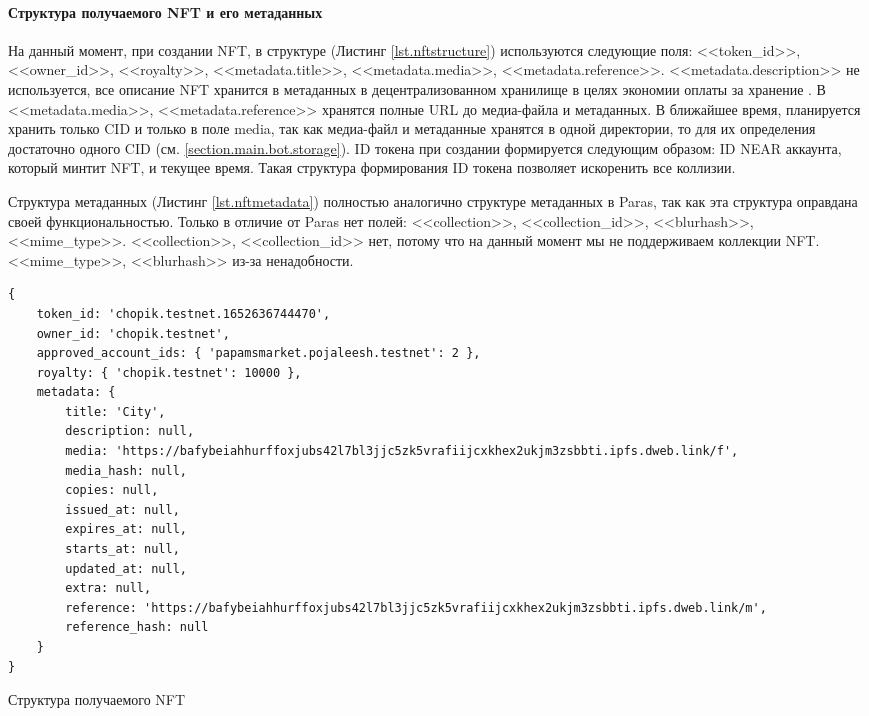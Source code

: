 \paragraph{Структура получаемого NFT и его метаданных}
\label{section.main.bot.struct}
На данный момент, при создании NFT, в структуре (Листинг {\color{blue}\ref{lst.nftstructure}}) используются следующие поля: <<token\_id>>, <<owner\_id>>, <<royalty>>, <<metadata.title>>, <<metadata.media>>, <<metadata.reference>>. <<metadata.description>> не используется, все описание NFT хранится в метаданных в децентрализованном хранилище в целях экономии оплаты за хранение . В <<metadata.media>>, <<metadata.reference>> хранятся полные URL до медиа-файла и метаданных. В ближайшее время, планируется хранить только CID и только в поле media, так как медиа-файл и метаданные хранятся в одной директории, то для их определения достаточно одного CID (см. {\color{blue} \ref{section.main.bot.storage}}). ID токена при создании формируется следующим образом: ID NEAR аккаунта, который минтит NFT, и текущее время. Такая структура формирования ID токена позволяет искоренить все коллизии.

Структура метаданных (Листинг {\color{blue}\ref{lst.nftmetadata}}) полностью аналогично структуре метаданных в Paras, так как эта структура оправдана своей функциональностью. Только в отличие от Paras нет полей: <<collection>>, <<collection\_id>>, <<blurhash>>, <<mime\_type>>. <<collection>>, <<collection\_id>> нет, потому что на данный момент мы не поддерживаем коллекции NFT. <<mime\_type>>, <<blurhash>> из-за ненадобности.

\begin{listing}
\begin{verbatim}
{
    token_id: 'chopik.testnet.1652636744470',
    owner_id: 'chopik.testnet',
    approved_account_ids: { 'papamsmarket.pojaleesh.testnet': 2 },
    royalty: { 'chopik.testnet': 10000 },
    metadata: {
        title: 'City',
        description: null,
        media: 'https://bafybeiahhurffoxjubs42l7bl3jjc5zk5vrafiijcxkhex2ukjm3zsbbti.ipfs.dweb.link/f',
        media_hash: null,
        copies: null,
        issued_at: null,
        expires_at: null,
        starts_at: null,
        updated_at: null,
        extra: null,
        reference: 'https://bafybeiahhurffoxjubs42l7bl3jjc5zk5vrafiijcxkhex2ukjm3zsbbti.ipfs.dweb.link/m',
        reference_hash: null
    }
}
\end{verbatim}
\caption{Структура получаемого NFT}
\label{lst.nftstructure}
\end{listing}

